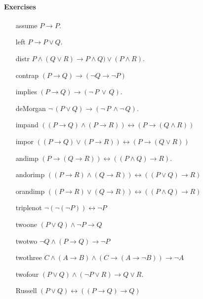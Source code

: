  \paragraph{\bf Exercises}\label{prop:exercises}
 \begin{enumerate}
 
 \item[assume] $P \rightarrow P$.
 \item[left]$ P \rightarrow P\lor Q$.
  \item[distr] $P\land (Q\lor R) \rightarrow P\land Q)\lor (P\land R).$
  \item [contrap]$ (P\rightarrow Q) \rightarrow (\neg Q \rightarrow \neg P)$
  \item[implies] $(P\rightarrow Q)\rightarrow (\neg\,P\,\lor \,Q).$
\item[deMorgan] $\neg\,(P\lor Q)\rightarrow (\neg\,P\,\land \neg\,Q).$

  
 \item[impand] $((P \rightarrow Q) \land (P \rightarrow R)) \leftrightarrow (P \rightarrow (Q\land R))$
\item[impor] $((P \rightarrow Q) \lor (P \rightarrow R)) \leftrightarrow (P \rightarrow (Q\lor R))$
\item[andimp] $(P\rightarrow(Q\rightarrow R)) \leftrightarrow ((P\land Q) \rightarrow R)$.
\item[andorimp] $((P \rightarrow R) \land (Q \rightarrow R)) \leftrightarrow ((P \lor Q) \rightarrow R)$
\item[orandimp] $((P \rightarrow R) \lor (Q \rightarrow R)) \leftrightarrow ((P \land Q) \rightarrow R)$
\item[triplenot] $\neg (\neg (\neg P))  \leftrightarrow \neg P$
\item[twoone] $(P \lor Q) \land \neg  P \rightarrow Q$
\item[twotwo] $\neg Q \land (P \rightarrow Q) \rightarrow  \neg P$
\item[twothree] $ C \land (A \rightarrow B) \land (C \rightarrow ( A \rightarrow \neg B)) \rightarrow \neg A$
\item[twofour] $ (P \lor  Q) \land (\neg P \lor R) \rightarrow Q \lor R$.

\item[Russell] \label{russel} $(P\lor Q)\leftrightarrow ((P\rightarrow Q)\rightarrow Q)$



\end{enumerate}
